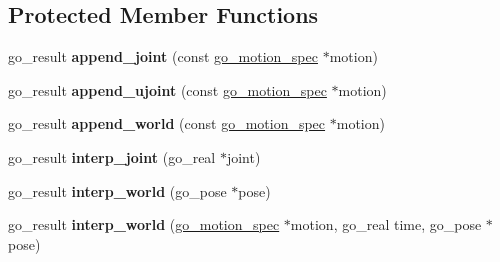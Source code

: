 \subsection*{Protected Member Functions}
\begin{DoxyCompactItemize}
\item 
\hypertarget{structgomotion_1_1go__motion__queue_a8530405c3ab2eb49c99b78804af3110f}{go\-\_\-result {\bfseries append\-\_\-joint} (const \hyperlink{structgomotion_1_1go__motion__spec}{go\-\_\-motion\-\_\-spec} $\ast$motion)}\label{structgomotion_1_1go__motion__queue_a8530405c3ab2eb49c99b78804af3110f}

\item 
\hypertarget{structgomotion_1_1go__motion__queue_a9764d6dc903c426e1e5277bc2ffd26bc}{go\-\_\-result {\bfseries append\-\_\-ujoint} (const \hyperlink{structgomotion_1_1go__motion__spec}{go\-\_\-motion\-\_\-spec} $\ast$motion)}\label{structgomotion_1_1go__motion__queue_a9764d6dc903c426e1e5277bc2ffd26bc}

\item 
\hypertarget{structgomotion_1_1go__motion__queue_a59948ff83135837e9b87385a4b220571}{go\-\_\-result {\bfseries append\-\_\-world} (const \hyperlink{structgomotion_1_1go__motion__spec}{go\-\_\-motion\-\_\-spec} $\ast$motion)}\label{structgomotion_1_1go__motion__queue_a59948ff83135837e9b87385a4b220571}

\item 
\hypertarget{structgomotion_1_1go__motion__queue_a6d7f6a8773b64aa9dfa95639288634c6}{go\-\_\-result {\bfseries interp\-\_\-joint} (go\-\_\-real $\ast$joint)}\label{structgomotion_1_1go__motion__queue_a6d7f6a8773b64aa9dfa95639288634c6}

\item 
\hypertarget{structgomotion_1_1go__motion__queue_a992ce6f5b03fc13da0fbd438d9bdb625}{go\-\_\-result {\bfseries interp\-\_\-world} (go\-\_\-pose $\ast$pose)}\label{structgomotion_1_1go__motion__queue_a992ce6f5b03fc13da0fbd438d9bdb625}

\item 
\hypertarget{structgomotion_1_1go__motion__queue_a5b0db307f2635f1cf5b643f68aed98ab}{go\-\_\-result {\bfseries interp\-\_\-world} (\hyperlink{structgomotion_1_1go__motion__spec}{go\-\_\-motion\-\_\-spec} $\ast$motion, go\-\_\-real time, go\-\_\-pose $\ast$pose)}\label{structgomotion_1_1go__motion__queue_a5b0db307f2635f1cf5b643f68aed98ab}

\end{DoxyCompactItemize}
